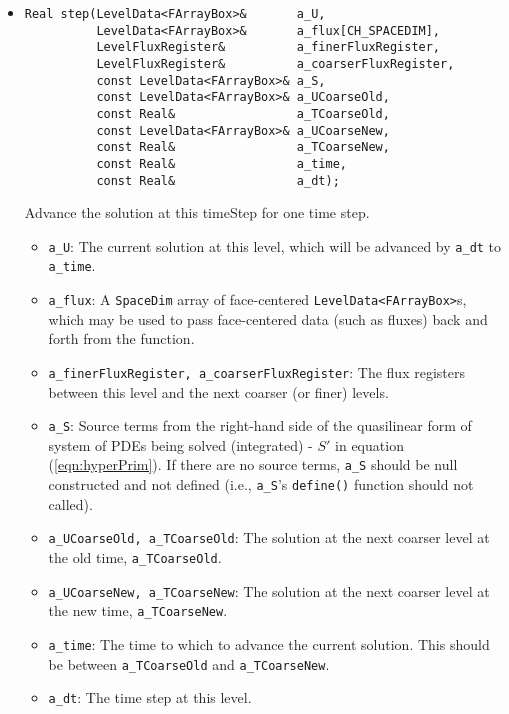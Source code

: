 \begin{itemize}
\item \begin{small} \begin{verbatim}
Real step(LevelData<FArrayBox>&       a_U,
          LevelData<FArrayBox>&       a_flux[CH_SPACEDIM],
          LevelFluxRegister&          a_finerFluxRegister,
          LevelFluxRegister&          a_coarserFluxRegister,
          const LevelData<FArrayBox>& a_S,
          const LevelData<FArrayBox>& a_UCoarseOld,
          const Real&                 a_TCoarseOld,
          const LevelData<FArrayBox>& a_UCoarseNew,
          const Real&                 a_TCoarseNew,
          const Real&                 a_time,
          const Real&                 a_dt);
\end{verbatim}\end{small}
Advance the solution at this timeStep for one time step.
\begin{itemize}
\item \verb/a_U/:  The current solution at this level, which will be
advanced by \verb/a_dt/ to \verb/a_time/.
\vspace{-0.07in}
\item \verb/a_flux/: A \verb/SpaceDim/ array of face-centered
  \verb/LevelData<FArrayBox>/s, which may be used to pass face-centered
  data (such as fluxes) back and forth from the function.
\vspace{-0.07in}
\item \verb/a_finerFluxRegister, a_coarserFluxRegister/:  The flux
registers between this level and the next coarser (or finer) levels. 
\vspace{-0.07in}
\item \verb/a_S/:  Source terms from the right-hand side of the quasilinear form of system
of PDEs being solved (integrated) - $S'$ in equation (\ref{eqn:hyperPrim}).
If there are no source terms, \verb/a_S/ should be null constructed and not
defined (i.e., \verb/a_S/'s \verb/define()/ function should not called).
\vspace{-0.07in}
\item \verb/a_UCoarseOld, a_TCoarseOld/:  The solution at the
next coarser level at the old time, \verb/a_TCoarseOld/.
\vspace{-0.07in}
\item \verb/a_UCoarseNew, a_TCoarseNew/:  The solution at the
next coarser level at the new time, \verb/a_TCoarseNew/.
\vspace{-0.07in}
\item \verb/a_time/:  The time to which to advance the current
solution.  This should be between \verb/a_TCoarseOld/ and \verb/a_TCoarseNew/.
\vspace{-0.07in}
\item \verb/a_dt/:  The time step at this level.
\end{itemize}


\end{itemize}
